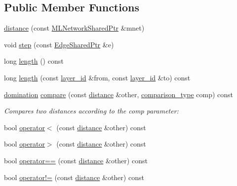 \subsection*{Public Member Functions}
\begin{DoxyCompactItemize}
\item 
\hyperlink{classmlnet_1_1distance_a51e12ba523084477376d511fd5e09cec}{distance} (const \hyperlink{namespacemlnet_aa6d3fa87865bcde4d1283abb1942cbbb}{M\+L\+Network\+Shared\+Ptr} \&mnet)
\item 
void \hyperlink{classmlnet_1_1distance_a84444db65304993aee043433d4230a5f}{step} (const \hyperlink{namespacemlnet_a33e88c3df9bea691a269d5e5d8bea57d}{Edge\+Shared\+Ptr} \&e)
\item 
long \hyperlink{classmlnet_1_1distance_ab4fbc7e9f6c432cc09c1746660e0ad77}{length} () const 
\item 
long \hyperlink{classmlnet_1_1distance_a9181679393e349f807c941d0b235c2a1}{length} (const \hyperlink{namespacemlnet_a84ad9c6056f0eb7d129995351f9b13fb}{layer\+\_\+id} \&from, const \hyperlink{namespacemlnet_a84ad9c6056f0eb7d129995351f9b13fb}{layer\+\_\+id} \&to) const 
\item 
\hyperlink{namespacemlnet_a49cbf481a06184d43958acdfc5d4fc60}{domination} \hyperlink{classmlnet_1_1distance_a713d9d390380246f1baf1cae2c1985f6}{compare} (const \hyperlink{classmlnet_1_1distance}{distance} \&other, \hyperlink{namespacemlnet_ac59b03c9fd702da21a0c3c2a4bba57c9}{comparison\+\_\+type} comp) const 
\begin{DoxyCompactList}\small\item\em Compares two distances according to the comp parameter\+: \end{DoxyCompactList}\item 
bool \hyperlink{classmlnet_1_1distance_ab9376eda4dcc818d9d656c002945c574}{operator$<$} (const \hyperlink{classmlnet_1_1distance}{distance} \&other) const 
\item 
bool \hyperlink{classmlnet_1_1distance_ac401f9433fa0533b5aa068bce4967c92}{operator$>$} (const \hyperlink{classmlnet_1_1distance}{distance} \&other) const 
\item 
bool \hyperlink{classmlnet_1_1distance_ac410d457518bf8f13873b6e3324ef18b}{operator==} (const \hyperlink{classmlnet_1_1distance}{distance} \&other) const 
\item 
bool \hyperlink{classmlnet_1_1distance_ad5e31fdb75840e134b9dc7662ad11e4c}{operator!=} (const \hyperlink{classmlnet_1_1distance}{distance} \&other) const 
\end{DoxyCompactItemize}



